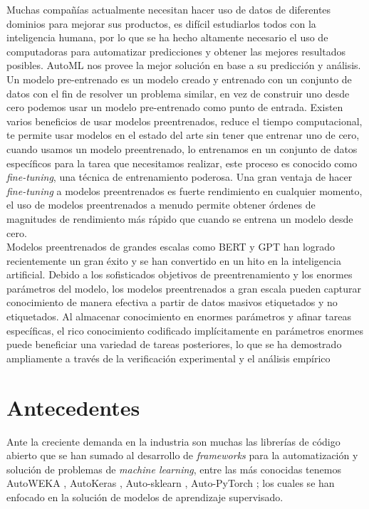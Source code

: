  Muchas compañías actualmente necesitan hacer uso de datos de diferentes dominios para mejorar sus productos, es difícil estudiarlos todos con la inteligencia humana, por lo que se ha hecho altamente necesario el uso de computadoras para automatizar predicciones y obtener las mejores resultados posibles. AutoML nos provee la mejor solución en base a su predicción y análisis.\\

Un modelo pre-entrenado es un modelo creado y entrenado con un conjunto de datos con el fin de resolver un problema similar, en vez de construir uno desde cero podemos usar un modelo pre-entrenado como punto de entrada. Existen varios beneficios de usar modelos preentrenados, reduce el tiempo computacional, te permite usar modelos en el estado del arte sin tener que entrenar uno de cero, cuando usamos un modelo preentrenado, lo entrenamos en un conjunto de datos específicos para la tarea que necesitamos realizar, este proceso es conocido como \textit{fine-tuning}, una técnica de entrenamiento poderosa. Una gran ventaja de hacer \textit{fine-tuning} a modelos preentrenados es fuerte rendimiento en cualquier momento, el uso de modelos preentrenados a menudo permite obtener órdenes de magnitudes de rendimiento más rápido que cuando se entrena un modelo desde cero. \\

Modelos preentrenados de grandes escalas como BERT \parencite{11} y GPT \parencite{12} han logrado recientemente un gran éxito y se han convertido en un hito en la inteligencia artificial. Debido a los sofisticados objetivos de preentrenamiento y los enormes parámetros del modelo, los modelos preentrenados a gran escala pueden capturar conocimiento de manera efectiva a partir de datos masivos etiquetados y no etiquetados. Al almacenar conocimiento en enormes parámetros y afinar tareas específicas, el rico conocimiento codificado implícitamente en parámetros enormes puede beneficiar una variedad de tareas posteriores, lo que se ha demostrado ampliamente a través de la verificación experimental y el análisis empírico \\

\section*{Antecedentes}
Ante la creciente demanda en la industria son muchas las librerías de código abierto que se han sumado al desarrollo de \textit{frameworks} para la automatización y solución de problemas de \textit{machine learning}, entre las más conocidas tenemos AutoWEKA \parencite{13}, AutoKeras \parencite{14}, Auto-sklearn \parencite{15}, Auto-PyTorch \parencite{16}; los cuales se han enfocado en la solución de modelos de aprendizaje supervisado.\\

